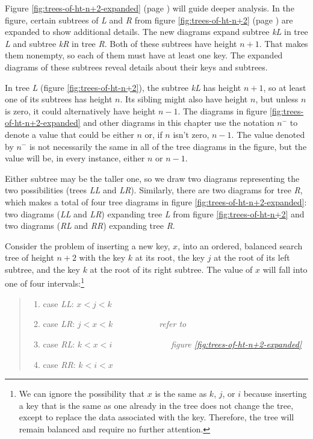 Figure \ref{fig:trees-of-ht-n+2-expanded} (page \pageref{fig:trees-of-ht-n+2-expanded})
will guide deeper analysis.
In the figure, certain subtrees of \emph{L} and \emph{R} from
figure \ref{fig:trees-of-ht-n+2} (page \pageref{fig:trees-of-ht-n+2})
are expanded to show additional details.
The new diagrams expand subtree
\emph{kL} in tree \emph{L} and subtree \emph{kR} in tree \emph{R}.
Both of these subtrees have height $n+1$.
That makes them nonempty, so each of them must have at least one key.
The expanded diagrams of these subtrees
reveal details about their keys and subtrees.

In tree \emph{L} (figure \ref{fig:trees-of-ht-n+2}),
the subtree \emph{kL} has height $n+1$,
so at least one of its subtrees has height $n$.
Its sibling might also have height $n$, but unless $n$ is zero,
it could alternatively have height $n-1$.
The diagrams in figure \ref{fig:trees-of-ht-n+2-expanded}
and other diagrams in this chapter
use the notation $n^-$
to denote a value that could be either $n$
or, if $n$ isn't zero, $n-1$.
The value denoted by $n^-$ is not necessarily the same
in all of the tree diagrams in the figure,
but the value will be, in every instance,
either $n$ or $n-1$.

Either subtree may be the taller one,
so we draw two diagrams representing the two possibilities
(trees \emph{LL} and \emph{LR}).
Similarly, there are two diagrams for tree \emph{R},
which makes a total of four tree diagrams in
figure \ref{fig:trees-of-ht-n+2-expanded}:
two diagrams (\emph{LL} and \emph{LR})
expanding tree \emph{L} from figure \ref{fig:trees-of-ht-n+2}
and two diagrams (\emph{RL} and \emph{RR}) expanding tree \emph{R}.

Consider the problem of inserting a new key, $x$, into
an ordered, balanced search tree of height $n+2$ with the key $k$
at its root, the key $j$ at the root of its left subtree,
and the key $k$ at the root of its right subtree.
The value of $x$ will fall into one of four intervals:\footnote{We
can ignore the possibility that $x$ is the same as
$k$, $j$, or $i$ because
inserting a key that is the same as one already in the
tree does not change the tree,
except to replace the data associated with the key.
Therefore, the tree will remain balanced and
require no further attention.}
\label{cases:ht-n+2}\begin{quote}
\begin{enumerate}
\item case \emph{LL}: $x < j < k$
\item case \emph{LR}: $j < x < k$~~~~~~~~~~~\emph{refer to }
\item case \emph{RL}: $k < x < i$~~~~~~~~~~~~~~\emph{figure \ref{fig:trees-of-ht-n+2-expanded}}
\item case \emph{RR}: $k < i < x$
\end{enumerate}
\end{quote}

